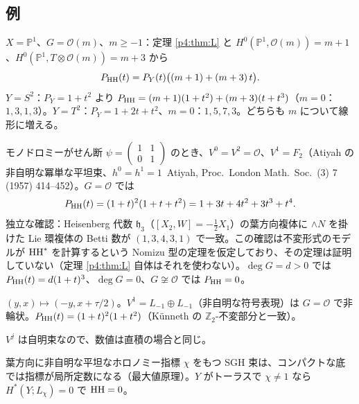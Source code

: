 \subsection{例}\label{p4:sec:examples}
\begin{ex}\tP\tV
$X=\mathbb P^1$、$G=\mathcal O(m)$、$m\ge-1$：定理 \ref{p4:thm:L} と $H^0(\mathbb P^1,\mathcal O(m))=m+1$、$H^0(\mathbb P^1,T\otimes\mathcal O(m))=m+3$ から
\[P_{\mathrm{HH}}(t)=P_Y(t)\bigl((m+1)+(m+3)\,t\bigr).\]
$Y=S^2$：$P_Y=1+t^2$ より $P_{\mathrm{HH}}=(m+1)(1+t^2)+(m+3)(t+t^3)$（$m=0$：$1,3,1,3$）。$Y=T^2$：$P_Y=1+2t+t^2$、$m=0$：$1,5,7,3$。どちらも $m$ について線形に増える。
\end{ex}
\begin{ex}\tP\tV\tQ
モノドロミーがせん断 $\psi=\begin{pmatrix}1&1\\0&1\end{pmatrix}$ のとき、$V^0=V^2=\mathcal O$、$V^1=F_2$（Atiyah の非自明な冪単な平坦束、$h^0=h^1=1$\tC\ Atiyah, Proc.\ London Math.\ Soc.\ (3) 7 (1957) 414--452）。$G=\mathcal O$ では
\[P_{\mathrm{HH}}(t)=(1+t)^2(1+t+t^2)=1+3t+4t^2+3t^3+t^4.\]
独立な確認：Heisenberg 代数 $\mathfrak h_3$（$[X_2,W]=-\tfrac12X_1$）の葉方向複体に $\wedge N$ を掛けた Lie 環複体の Betti 数が $(1,3,4,3,1)$ で一致\tV。この確認は不変形式のモデルが $\mathrm{HH}^*$ を計算するという Nomizu 型の定理を仮定しており、その定理は証明していない\tQ（定理 \ref{p4:thm:L} 自体はそれを使わない）。$\deg G=d>0$ では $P_{\mathrm{HH}}(t)=d(1+t)^3$、$\deg G=0$、$G\not\cong\mathcal O$ では $P_{\mathrm{HH}}=0$。
\end{ex}
\begin{ex}\tP\tV
$(y,x)\mapsto(-y,x+\tau/2)$。$V^1=L_{-1}\oplus L_{-1}$（非自明な符号表現）は $G=\mathcal O$ で非輪状。$P_{\mathrm{HH}}(t)=(1+t)^2(1+t^2)$（Künneth の $\mathbb Z_2$-不変部分と一致）。
\end{ex}
\begin{ex}[ホロノミーが $SO(3)$ の $S^2$-束]\tP
$V^j$ は自明束なので、数値は直積の場合と同じ。
\end{ex}
\begin{rem}
葉方向に非自明な平坦なホロノミー指標 $\chi$ をもつ SGH 束は、コンパクトな底では指標が局所定数になる（最大値原理）。$Y$ がトーラスで $\chi\neq1$ なら $H^*(Y;L_\chi)=0$ で $\mathrm{HH}=0$。\tP
\end{rem}

